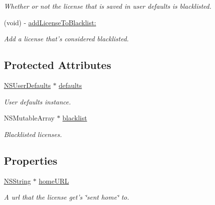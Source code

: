 \begin{DoxyCompactItemize}
\begin{DoxyCompactList}\small\item\em Whether or not the license that is saved in user defaults is blacklisted. \item\end{DoxyCompactList}\item 
(void) -\/ \hyperlink{interface_g_d_registration_a7b212d406ecc9f8dc9dc19714baac7f8}{addLicenseToBlacklist:}
\begin{DoxyCompactList}\small\item\em Add a license that's considered blacklisted. \item\end{DoxyCompactList}\end{DoxyCompactItemize}
\subsection*{Protected Attributes}
\begin{DoxyCompactItemize}
\item 
\hypertarget{interface_g_d_registration_a951a74df6032c61bdc6215df98dfc10f}{
\hyperlink{class_n_s_user_defaults}{NSUserDefaults} $\ast$ \hyperlink{interface_g_d_registration_a951a74df6032c61bdc6215df98dfc10f}{defaults}}
\label{interface_g_d_registration_a951a74df6032c61bdc6215df98dfc10f}

\begin{DoxyCompactList}\small\item\em User defaults instance. \item\end{DoxyCompactList}\item 
\hypertarget{interface_g_d_registration_a2cec9ccef516bf4ecbf55de00bf0dbda}{
NSMutableArray $\ast$ \hyperlink{interface_g_d_registration_a2cec9ccef516bf4ecbf55de00bf0dbda}{blacklist}}
\label{interface_g_d_registration_a2cec9ccef516bf4ecbf55de00bf0dbda}

\begin{DoxyCompactList}\small\item\em Blacklisted licenses. \item\end{DoxyCompactList}\end{DoxyCompactItemize}
\subsection*{Properties}
\begin{DoxyCompactItemize}
\item 
\hyperlink{class_n_s_string}{NSString} $\ast$ \hyperlink{interface_g_d_registration_a8b801d18afbdb3062e0a79f39d0aee66}{homeURL}
\begin{DoxyCompactList}\small\item\em A url that the license get's \char`\"{}sent home\char`\"{} to. \item\end{DoxyCompactList}\end{DoxyCompactItemize}


